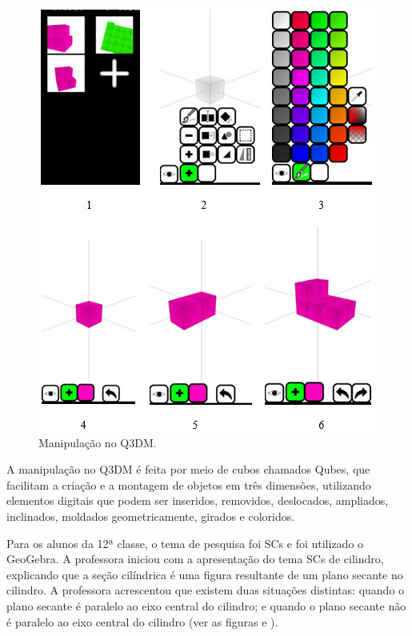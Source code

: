 \begin{figure}[htpb]
\centering
\begin{minipage}{.5\textwidth}
\includegraphics[width=\textwidth]{figures/figure04.jpg}
\caption{Manipulação no Q3DM.}
\label{fig-04}
\end{minipage}
\end{figure}


A manipulação no Q3DM é feita por meio de cubos chamados Qubes, que
facilitam a criação e a montagem de objetos em três dimensões,
utilizando elementos digitais que podem ser inseridos, removidos,
deslocados, ampliados, inclinados, moldados geometricamente, girados e
coloridos.

Para os alunos da 12ª classe, o tema de pesquisa foi SCs e foi utilizado
o GeoGebra. A professora iniciou com a apresentação do tema SCs de
cilindro, explicando que a seção cilíndrica é uma figura resultante de
um plano secante no cilindro. A professora acrescentou que existem duas
situações distintas: quando o plano secante é paralelo ao eixo central
do cilindro; e quando o plano secante não é paralelo ao eixo central do
cilindro (ver as figuras  e ).

